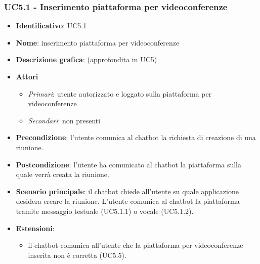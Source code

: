 \subsubsection{UC5.1 - Inserimento piattaforma per videoconferenze}
\begin{itemize}
    \item \textbf{Identificativo}: UC5.1
    \item \textbf{Nome}: inserimento piattaforma per videoconferenze
    \item \textbf{Descrizione grafica}: (approfondita in UC5)
    \item \textbf{Attori}
 \begin{itemize} 
    \item \textit{Primari}: utente autorizzato e loggato sulla piattaforma per videoconferenze
    \item \textit{Secondari}: non presenti
 \end{itemize}
 \item \textbf{Precondizione}: l'utente comunica al chatbot la richiesta di creazione di una riunione.
 \item \textbf{Postcondizione}: l'utente ha comunicato al chatbot la piattaforma sulla quale verrà creata la riunione.
 \item \textbf{Scenario principale}: il chatbot chiede all'utente su quale applicazione desidera creare la riunione. L'utente comunica al chatbot la piattaforma tramite messaggio testuale (UC5.1.1) o vocale (UC5.1.2).
 \item \textbf{Estensioni}: 
 \begin{itemize} 
    \item il chatbot comunica all'utente che la piattaforma per videoconferenze inserita non è corretta (UC5.5).
 \end{itemize}
\end{itemize}

